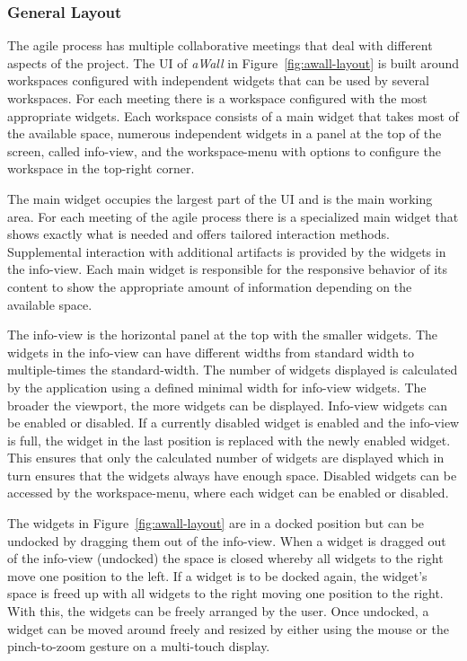 \documentclass{sigchi}
\begin{document}
\subsubsection{General Layout}

The agile process has multiple collaborative meetings that deal with different aspects of the project.
The UI of \textit{aWall} in Figure~\ref{fig:awall-layout} is built around workspaces configured with independent widgets that can be used by several workspaces.
For each meeting there is a workspace configured with the most appropriate widgets.
Each workspace consists of a main widget that takes most of the available space, numerous independent widgets in a panel at the top of the screen, called info-view, and the workspace-menu with options to configure the workspace in the top-right corner.

The main widget occupies the largest part of the UI and is the main working area.
For each meeting of the agile process there is a specialized main widget that shows exactly what is needed and offers tailored interaction methods.
Supplemental interaction with additional artifacts is provided by the widgets in the info-view.
Each main widget is responsible for the responsive behavior of its content to show the appropriate amount of information depending on the available space.

The info-view is the horizontal panel at the top with the smaller widgets.
The widgets in the info-view can have different widths from standard width to multiple-times the standard-width.
The number of widgets displayed is calculated by the application using a defined minimal width for info-view widgets. 
The broader the viewport, the more widgets can be displayed.
Info-view widgets can be enabled or disabled.
If a currently disabled widget is enabled and the info-view is full, the widget in the last position is replaced with the newly enabled widget.
This ensures that only the calculated number of widgets are displayed which in turn ensures that the widgets always have enough space.
Disabled widgets can be accessed by the workspace-menu, where each widget can be enabled or disabled. 

The widgets in Figure~\ref{fig:awall-layout} are in a docked position but can be undocked by dragging them out of the info-view.
When a widget is dragged out of the info-view (undocked) the space is closed whereby all widgets to the right move one position to the left.
If a widget is to be docked again, the widget's space is freed up with all widgets to the right moving one position to the right.
With this, the widgets can be freely arranged by the user.
Once undocked, a widget can be moved around freely and resized by either using the mouse or the pinch-to-zoom gesture on a multi-touch display. 
\end{document}
